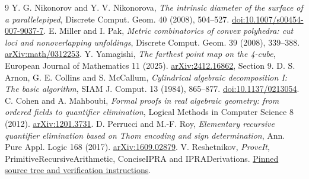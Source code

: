 \documentclass[10pt,letterpaper]{article}
\begin{document}
\begin{thebibliography}{9}\small
{} Y. G. Nikonorov and Y. V. Nikonorova, \emph{The intrinsic diameter of the surface of a parallelepiped}, Discrete Comput. Geom. 40 (2008), 504--527. \href{https://doi.org/10.1007/s00454-007-9037-7}{doi:10.1007/s00454-007-9037-7}.
 E. Miller and I. Pak, \emph{Metric combinatorics of convex polyhedra: cut loci and nonoverlapping unfoldings}, Discrete Comput. Geom. 39 (2008), 339--388. \href{https://arxiv.org/abs/math/0312253}{arXiv:math/0312253}.
 Y. Yamagishi, \emph{The farthest point map on the 4-cube}, European Journal of Mathematics 11 (2025). \href{https://arxiv.org/abs/2412.16862}{arXiv:2412.16862}, Section 9.
 D. S. Arnon, G. E. Collins and S. McCallum, \emph{Cylindrical algebraic decomposition I: The basic algorithm}, SIAM J. Comput. 13 (1984), 865--877. \href{https://doi.org/10.1137/0213054}{doi:10.1137/0213054}.
 C. Cohen and A. Mahboubi, \emph{Formal proofs in real algebraic geometry: from ordered fields to quantifier elimination}, Logical Methods in Computer Science 8 (2012). \href{https://arxiv.org/abs/1201.3731}{arXiv:1201.3731}. D. Perrucci and M.-F. Roy, \emph{Elementary recursive quantifier elimination based on Thom encoding and sign determination}, Ann. Pure Appl. Logic 168 (2017). \href{https://arxiv.org/abs/1609.02879}{arXiv:1609.02879}.
 V. Reshetnikov, \emph{ProveIt}, PrimitiveRecursiveArithmetic, ConciseIPRA and IPRADerivations. \href{https://github.com/VladimirReshetnikov/ProveIt/tree/09fe17194da14cdd100947737952e44100bb71b8/Logic/PrimitiveRecursiveArithmetic}{Pinned source tree and verification instructions}.
\end{thebibliography}
\end{document}
